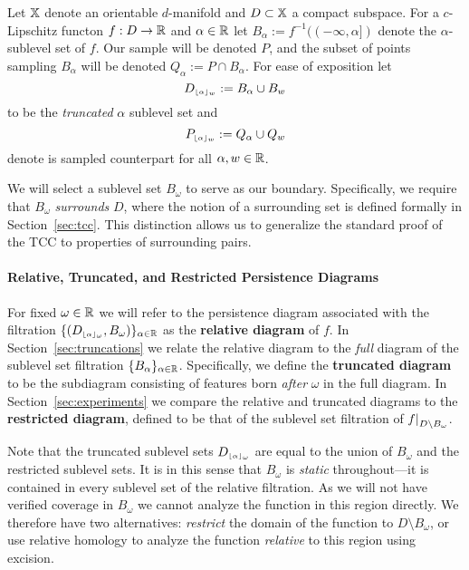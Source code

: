 
Let $\mathbb{X}$ denote an orientable $d$-manifold and $D\subset\mathbb{X}$ a compact subspace.
For a $c$-Lipschitz functon $f : D\to \mathbb{R}$ and $\alpha\in\mathbb{R}$ let $B_\alpha := f^{-1}((-\infty,\alpha])$ denote the $\alpha$-sublevel set of $f$.
Our sample will be denoted $P$, and the subset of points sampling $B_\alpha$ will be denoted $Q_\alpha := P\cap B_\alpha$.
For ease of exposition let
\[ D_{\scriptscriptstyle \lfloor\alpha\rfloor_{w}} := B_\alpha\cup B_w \]
to be the \emph{truncated} $\alpha$ sublevel set and  %
\[ P_{\scriptscriptstyle \lfloor\alpha\rfloor_{w}} := Q_\alpha\cup Q_w\]
denote is sampled counterpart for all $\alpha,w\in\mathbb{R}$.

We will select a sublevel set $B_\omega$ to serve as our boundary.
Specifically, we require that $B_\omega$ \emph{surrounds} $D$, where the notion of a surrounding set is defined formally in Section~\ref{sec:tcc}.
This distinction allows us to generalize the standard proof of the TCC to properties of surrounding pairs.

\paragraph*{Relative, Truncated, and Restricted Persistence Diagrams}

For fixed $\omega\in\mathbb{R}$ we will refer to the persistence diagram associated with the filtration $\{(D_{\scriptscriptstyle \lfloor\alpha\rfloor_{\omega}}, B_\omega)\}_{\alpha\in\mathbb{R}}$  as the \textbf{relative diagram} of $f$.
In Section~\ref{sec:truncations} we relate the relative diagram to the \emph{full} diagram of the sublevel set filtration $\{B_\alpha\}_{\alpha\in\mathbb{R}}$.
Specifically, we define the \textbf{truncated diagram} to be the subdiagram consisting of features born \emph{after} $\omega$ in the full diagram.
In Section~\ref{sec:experiments} we compare the relative and truncated diagrams to the \textbf{restricted diagram}, defined to be that of the sublevel set filtration of $f\mathord{\mid}_{D\setminus B_\omega}$.%

Note that the truncated sublevel sets $D_{\scriptscriptstyle \lfloor\alpha\rfloor_{\omega}}$ are equal to the union of $B_\omega$ and the restricted sublevel sets.
It is in this sense that $B_\omega$ is \emph{static} throughout---it is contained in every sublevel set of the relative filtration.
As we will not have verified coverage in $B_\omega$ we cannot analyze the function in this region directly.
We therefore have two alternatives: \emph{restrict} the domain of the function to $D\setminus B_\omega$, or use relative homology to analyze the function \emph{relative} to this region using excision.


